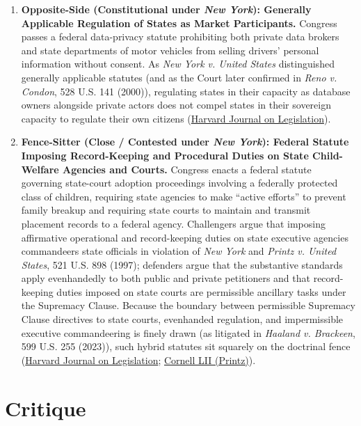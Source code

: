 \documentclass[12pt]{article}
\begin{document}
\begin{enumerate}
    \item \textbf{Opposite-Side (Constitutional under \textit{New York}): Generally Applicable Regulation of States as Market Participants.} Congress passes a federal data-privacy statute prohibiting both private data brokers and state departments of motor vehicles from selling drivers' personal information without consent. As \textit{New York v. United States} distinguished generally applicable statutes (and as the Court later confirmed in \textit{Reno v. Condon}, 528 U.S. 141 (2000)), regulating states in their capacity as database owners alongside private actors does not compel states in their sovereign capacity to regulate their own citizens (\href{https://journals.law.harvard.edu/jol/2025/02/22/anticommandeering-indian-affairs-legislation/}{Harvard Journal on Legislation}).

    \item \textbf{Fence-Sitter (Close / Contested under \textit{New York}): Federal Statute Imposing Record-Keeping and Procedural Duties on State Child-Welfare Agencies and Courts.} Congress enacts a federal statute governing state-court adoption proceedings involving a federally protected class of children, requiring state agencies to make ``active efforts'' to prevent family breakup and requiring state courts to maintain and transmit placement records to a federal agency. Challengers argue that imposing affirmative operational and record-keeping duties on state executive agencies commandeers state officials in violation of \textit{New York} and \textit{Printz v. United States}, 521 U.S. 898 (1997); defenders argue that the substantive standards apply evenhandedly to both public and private petitioners and that record-keeping duties imposed on state courts are permissible ancillary tasks under the Supremacy Clause. Because the boundary between permissible Supremacy Clause directives to state courts, evenhanded regulation, and impermissible executive commandeering is finely drawn (as litigated in \textit{Haaland v. Brackeen}, 599 U.S. 255 (2023)), such hybrid statutes sit squarely on the doctrinal fence (\href{https://journals.law.harvard.edu/jol/2025/02/22/anticommandeering-indian-affairs-legislation/}{Harvard Journal on Legislation}; \href{https://www.law.cornell.edu/supct/html/95-1478.ZO.html}{Cornell LII (Printz)}).
\end{enumerate}

\section{Critique}
\end{document}
